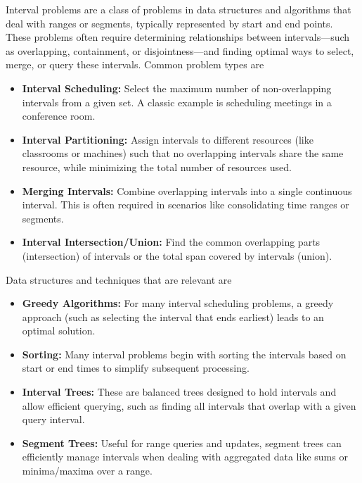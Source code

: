 \documentclass{report}
\begin{document}
    \pagebreak 
    \bigbreak \noindent 
    Interval problems are a class of problems in data structures and algorithms that deal with ranges or segments, typically represented by start and end points. These problems often require determining relationships between intervals—such as overlapping, containment, or disjointness—and finding optimal ways to select, merge, or query these intervals.
    \bigbreak \noindent 
    Common problem types are
    \begin{itemize}
        \item \textbf{Interval Scheduling:} Select the maximum number of non-overlapping intervals from a given set. A classic example is scheduling meetings in a conference room.
        \item \textbf{Interval Partitioning:} Assign intervals to different resources (like classrooms or machines) such that no overlapping intervals share the same resource, while minimizing the total number of resources used.
        \item \textbf{Merging Intervals:} Combine overlapping intervals into a single continuous interval. This is often required in scenarios like consolidating time ranges or segments.
        \item \textbf{Interval Intersection/Union:} Find the common overlapping parts (intersection) of intervals or the total span covered by intervals (union).
    \end{itemize}
    \bigbreak \noindent 
    Data structures and techniques that are relevant are
    \begin{itemize}
        \item \textbf{Greedy Algorithms:} For many interval scheduling problems, a greedy approach (such as selecting the interval that ends earliest) leads to an optimal solution.
        \item \textbf{Sorting:} Many interval problems begin with sorting the intervals based on start or end times to simplify subsequent processing.
        \item \textbf{Interval Trees:} These are balanced trees designed to hold intervals and allow efficient querying, such as finding all intervals that overlap with a given query interval.
        \item \textbf{Segment Trees:} Useful for range queries and updates, segment trees can efficiently manage intervals when dealing with aggregated data like sums or minima/maxima over a range.
    \end{itemize}
\end{document}

